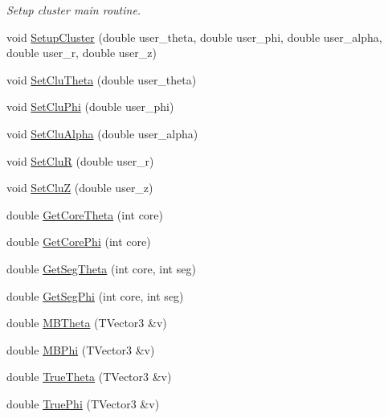 \begin{DoxyCompactItemize}
\begin{DoxyCompactList}\small\item\em Setup cluster main routine. \end{DoxyCompactList}\item 
void \hyperlink{class_m_b_geometry_ac3751c8eb94c051b402c30cb14cba462}{Setup\-Cluster} (double user\-\_\-theta, double user\-\_\-phi, double user\-\_\-alpha, double user\-\_\-r, double user\-\_\-z)
\item 
void \hyperlink{class_m_b_geometry_a9a2a8c9609141be92d7ba30e6087aa30}{Set\-Clu\-Theta} (double user\-\_\-theta)
\item 
void \hyperlink{class_m_b_geometry_a74142f84cf6317d52ae39c0e0ff8a87e}{Set\-Clu\-Phi} (double user\-\_\-phi)
\item 
void \hyperlink{class_m_b_geometry_a0d4868b0360a6e5534918a9813540015}{Set\-Clu\-Alpha} (double user\-\_\-alpha)
\item 
void \hyperlink{class_m_b_geometry_a292c4326421c78871667e91c3694ae35}{Set\-Clu\-R} (double user\-\_\-r)
\item 
void \hyperlink{class_m_b_geometry_aa6b9d54c7157e8c65e2b208fcef8222c}{Set\-Clu\-Z} (double user\-\_\-z)
\item 
double \hyperlink{class_m_b_geometry_a42aa536f15017724812712b0f8a77c12}{Get\-Core\-Theta} (int core)
\item 
double \hyperlink{class_m_b_geometry_a39f685610ae0e68e547a46f8ef992599}{Get\-Core\-Phi} (int core)
\item 
double \hyperlink{class_m_b_geometry_a49cdf742a2902fc85f0b24dfffa554a8}{Get\-Seg\-Theta} (int core, int seg)
\item 
double \hyperlink{class_m_b_geometry_a575ddd6022d2d686a83ebce3195b6c50}{Get\-Seg\-Phi} (int core, int seg)
\item 
double \hyperlink{class_m_b_geometry_af4adfb858000405b21f79a6bf10c3c37}{M\-B\-Theta} (T\-Vector3 \&v)
\item 
double \hyperlink{class_m_b_geometry_a399568d67bb83801ef6a2dbe963a535e}{M\-B\-Phi} (T\-Vector3 \&v)
\item 
double \hyperlink{class_m_b_geometry_afd393f9db7182de7fb19f0c934edb383}{True\-Theta} (T\-Vector3 \&v)
\item 
double \hyperlink{class_m_b_geometry_a718d9c7fcc4a5fb8b9ecaabdc7a0503f}{True\-Phi} (T\-Vector3 \&v)
\end{DoxyCompactItemize}
